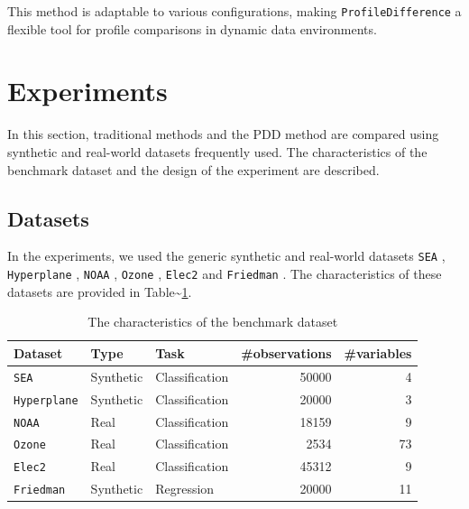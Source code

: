This method is adaptable to various configurations, making \texttt{ProfileDifference} a flexible tool for profile comparisons in dynamic data environments.

\hypertarget{experiments}{%
\section{Experiments}\label{experiments}}

In this section, traditional methods and the PDD method are compared using synthetic and real-world datasets frequently used. The characteristics of the benchmark dataset and the design of the experiment are described.

\hypertarget{datasets}{%
\subsection{Datasets}\label{datasets}}

In the experiments, we used the generic synthetic and real-world datasets \texttt{SEA} \citep{street_and_kim_2001}, \texttt{Hyperplane} \citep{hulten_et_al_2001}, \texttt{NOAA} \citep{elwell_polikar_2011}, \texttt{Ozone} \citep{zhang_and_fan_2008}, \texttt{Elec2} \citep{harries_1999} and \texttt{Friedman} \citep{ikonomovska_et_al_2011}. The characteristics of these datasets are provided in Table\textasciitilde{}\ref{tab:dataset}.

\begin{table}[H]
    \centering
    \small
    \caption{The characteristics of the benchmark dataset}
    \label{tab:dataset}
    \begin{tabular}{lllrr}\toprule
    \textbf{Dataset}        & \textbf{Type} & \textbf{Task}     & \textbf{\#observations}   & \textbf{\#variables} \\\midrule
    \texttt{SEA}            & Synthetic     & Classification    & 50000            & 4\\
    \texttt{Hyperplane}     & Synthetic     & Classification    & 20000            & 3\\
    \texttt{NOAA}           & Real          & Classification    & 18159            & 9\\
    \texttt{Ozone}          & Real          & Classification    & 2534             & 73\\
    \texttt{Elec2}          & Real          & Classification    & 45312            & 9\\
    \texttt{Friedman}       & Synthetic     & Regression        & 20000            & 11\\\bottomrule
    \end{tabular}
\end{table}

